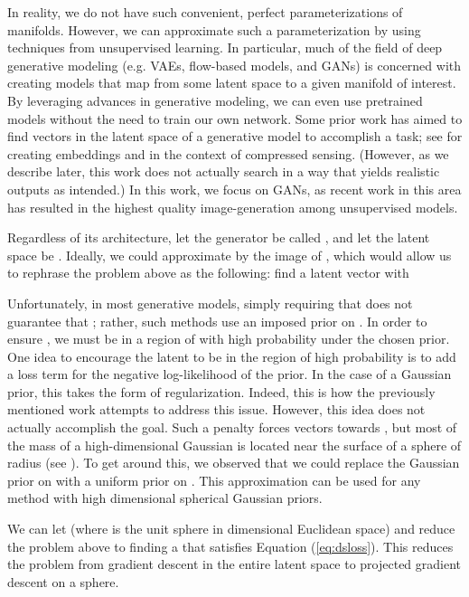 \documentclass[10pt,twocolumn,letterpaper]{article}
\begin{document}
In reality, we do not have such convenient, perfect parameterizations of manifolds. However, we can approximate such a parameterization by using techniques from unsupervised learning. In particular, much of the field of deep generative modeling (e.g. VAEs, flow-based models, and GANs) is concerned with creating models that map from some latent space to a given manifold of interest. By leveraging advances in generative modeling, we can even use pretrained models without the need to train our own network. Some prior work has aimed to find vectors in the latent space of a generative model to accomplish a task; see \cite{styleganembedding} for creating embeddings and \cite{bora2017compressed} in the context of compressed sensing. (However, as we describe later, this work does not actually search in a way that yields realistic outputs as intended.) In this work, we focus on GANs, as recent work in this area has resulted in the highest quality image-generation among unsupervised models.

Regardless of its architecture, let the generator be called , and let the latent space be . Ideally,  we could approximate  by the image of , which would allow us to rephrase the problem above as the following: find a latent vector  with 
 
Unfortunately, in most generative models, simply requiring that  does not guarantee that ; rather, such methods use an imposed prior on . In order to ensure , we must be in a region of  with high probability under the chosen prior. One idea to encourage the latent to be in the region of high probability is to add a loss term for the negative log-likelihood of the prior. In the case of a Gaussian prior, this takes the form of  regularization. Indeed, this is how the previously mentioned work \cite{bora2017compressed} attempts to address this issue. However, this idea does not actually accomplish the goal. Such a penalty forces vectors towards , but most of the mass of a high-dimensional Gaussian is located near the surface of a sphere of radius  (see \cite{vershynin_2018}). To get around this, we observed that we could replace the Gaussian prior on  with a uniform prior on . This approximation can be used for any method with high dimensional spherical Gaussian priors.


We can let  (where  is the unit sphere in  dimensional Euclidean space) and reduce the problem above to finding a  that satisfies Equation (\ref{eq:dsloss}). This reduces the problem from gradient descent in the entire latent space to projected gradient descent on a sphere.
\end{document}
